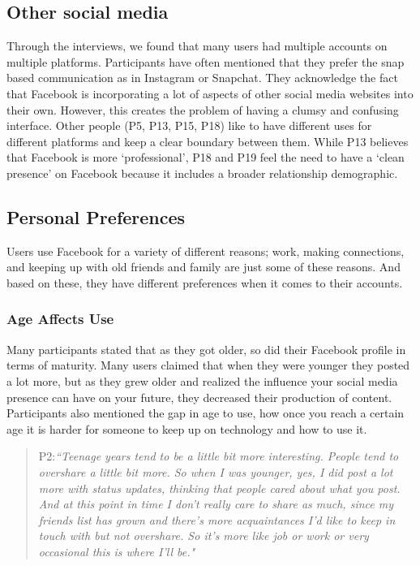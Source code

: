 \subsection{Other social media}
Through the interviews, we found that many users had multiple accounts on multiple platforms. Participants have often mentioned that they prefer the snap based communication as in Instagram or Snapchat. They acknowledge the fact that Facebook is incorporating a lot of aspects of other social media websites into their own. However, this creates the problem of having a clumsy and confusing interface. Other people (P5, P13, P15, P18) like to have different uses for different platforms and keep a clear boundary between them. While P13 believes that Facebook is more `professional', P18 and P19 feel the need to have a `clean presence' on Facebook because it includes a broader relationship demographic.

\subsection{Personal Preferences}
Users use Facebook for a variety of different reasons; work, making connections, and keeping up with old friends and family are just some of these reasons. And based on these, they have different preferences when it comes to their accounts.

\subsubsection{Age Affects Use}
Many participants stated that as they got older, so did their Facebook profile in terms of maturity. Many users claimed that when they were younger they posted a lot more, but as they grew older and realized the influence your social media presence can have on your future, they decreased their production of content. Participants also mentioned the gap in age to use, how once you reach a certain age it is harder for someone to keep up on technology and how to use it. 
\begin{quote}
P2:\textit{``Teenage years tend to be a little bit more interesting. People tend to overshare a little bit more. So when I was younger, yes, I did post a lot more with status updates, thinking that people cared about what you post. And at this point in time I don't really care to share as much, since my friends list has grown and there's more acquaintances I'd like to keep in touch with but not overshare. So it's more like job or work or very occasional this is where I'll be."}
\end{quote}

